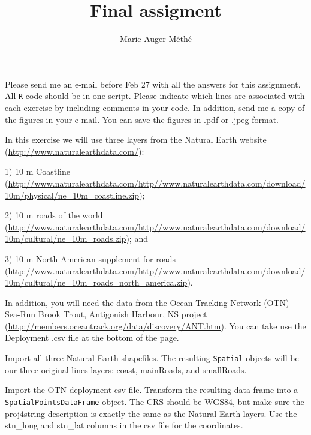 \documentclass[11pt, oneside]{article}   	%
\title{Final assigment}
\author{Marie Auger-M\'eth\'e}
\date{}							%
\begin{document}
\maketitle

Please send me an e-mail before Feb 27 with all the answers for this assignment. All \texttt{R} code should be in one script. Please indicate which lines are associated with each exercise by including comments in your code. In addition, send me a copy of the figures in your e-mail. You can save the figures in .pdf or .jpeg format.

\begin{Exercise}

In this exercise we will use three layers from the Natural Earth website (\url{http://www.naturalearthdata.com/}): 

1) 10 m Coastline (\url{http://www.naturalearthdata.com/http//www.naturalearthdata.com/download/10m/physical/ne_10m_coastline.zip});

2) 10 m roads of the world (\url{http://www.naturalearthdata.com/http//www.naturalearthdata.com/download/10m/cultural/ne_10m_roads.zip}); and

3) 10 m North American supplement for roads (\url{http://www.naturalearthdata.com/http//www.naturalearthdata.com/download/10m/cultural/ne_10m_roads_north_america.zip}).

In addition, you will need the data from the Ocean Tracking Network (OTN) Sea-Run Brook Trout, Antigonish Harbour, NS project (\url{http://members.oceantrack.org/data/discovery/ANT.htm}). You can take use the Deployment .csv file at the bottom of the page.

\Question Import all three Natural Earth shapefiles. The resulting \texttt{Spatial} objects will be our three original lines layers: coast, mainRoads, and smallRoads.

\Question Import the OTN deployment csv file. Transform the resulting data frame into a \texttt{SpatialPointsDataFrame} object. The CRS should be WGS84, but make sure the proj4string description is exactly the same as the Natural Earth layers. Use the stn\_long and stn\_lat columns in the csv file for the coordinates.

\end{Exercise}
\end{document}
